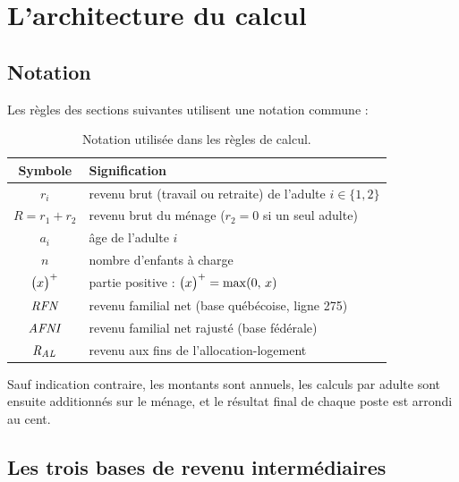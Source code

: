 \section{L'architecture du calcul}
\label{sec:architecture}

\subsection{Notation}

Les règles des sections suivantes utilisent une notation commune :

\begin{table}[ht]
\centering
\small
\begin{tabular}{c l}
\toprule
Symbole & Signification \\
\midrule
$r_i$            & revenu brut (travail ou retraite) de l'adulte $i \in \{1, 2\}$ \\
$R = r_1 + r_2$  & revenu brut du ménage ($r_2 = 0$ si un seul adulte) \\
$a_i$            & âge de l'adulte $i$ \\
$n$              & nombre d'enfants à charge \\
$\bigl(x\bigr)^{+}$        & partie positive : $\bigl(x\bigr)^{+} = \max(0,\,x)$ \\
$\mathit{RFN}$           & revenu familial net (base québécoise, ligne 275) \\
$\mathit{AFNI}$          & revenu familial net rajusté (base fédérale) \\
$\mathit{R_{AL}}$           & revenu aux fins de l'allocation-logement \\
\bottomrule
\end{tabular}
\caption{Notation utilisée dans les règles de calcul.}
\label{tab:notation}
\end{table}

Sauf indication contraire, les montants sont annuels, les calculs par adulte
sont ensuite additionnés sur le ménage, et le résultat final de chaque poste
est arrondi au cent.

\subsection{Les trois bases de revenu intermédiaires}
\label{sec:bases}

